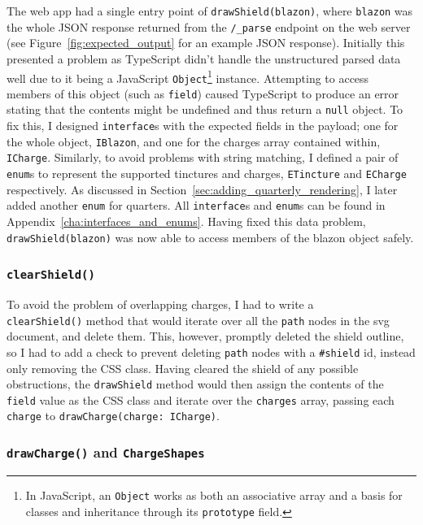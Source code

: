 \documentclass[nobib, a4paper, twoside, justified]{tufte-book}
\makeatletter
\newcommand{\svg}{\gls{svg}\@\xspace}
\newcommand{\charge}{\gls{charge}\@\xspace}
\newcommand{\charges}{\glspl{charge}\@\xspace}
\newcommand{\blazon}{\gls{blazon}\@\xspace}
\newcommand{\payload}{\gls{payload}\@\xspace}
\makeatother
\begin{document}
The web app had a single entry point of \texttt{drawShield(\blazon)}, where \texttt{\blazon} was
the whole JSON response returned from the \texttt{/\_parse} endpoint on the web server (see
Figure~\ref{fig:expected_output} for an example JSON response). Initially this presented a problem
as TypeScript didn't handle the unstructured parsed data well due to it being a JavaScript
\texttt{Object}\footnote{In JavaScript, an \texttt{Object} works as both an associative array and a
basis for classes and inheritance through its \texttt{prototype} field.} instance. Attempting to
access members of this object (such as \texttt{\gls{field}}) caused TypeScript to produce an error
stating that the contents might be undefined and thus return a \texttt{null} object. To fix this, I
designed \texttt{interface}s with the expected fields in the \payload; one for the whole object,
\texttt{IBlazon}, and one for the \charges array contained within, \texttt{ICharge}. Similarly, to
avoid problems with string matching, I defined a pair of \texttt{enum}s to represent the supported
tinctures and \charges, \texttt{ETincture} and \texttt{ECharge} respectively. As discussed in
Section~\ref{sec:adding_quarterly_rendering}, I later added another \texttt{enum} for quarters.
All \texttt{interface}s and \texttt{enum}s can be found in Appendix~\ref{cha:interfaces_and_enums}.
Having fixed this data problem, \texttt{drawShield(\blazon)} was now able to access members of the
\blazon object safely.

\subsubsection{\texttt{clearShield()}}%
\label{ssub:clear_shield}

To avoid the problem of overlapping \charges, I had to write a \\ \texttt{clearShield()} method
that would iterate over all the \texttt{path} nodes in the \svg document, and delete them. This,
however, promptly deleted the shield outline, so I had to add a check to prevent deleting
\texttt{path} nodes with a \texttt{\#shield} id, instead only removing the CSS class. Having
cleared the shield of any possible obstructions, the \texttt{drawShield} method would then assign
the contents of the \texttt{field} value as the CSS class and iterate over the \texttt{\charges}
array, passing each \texttt{\charge} to \texttt{drawCharge(charge: ICharge)}.

\subsubsection{\texttt{drawCharge()} and \texttt{ChargeShapes}}%
\label{ssub:draw_charge}
\end{document}
